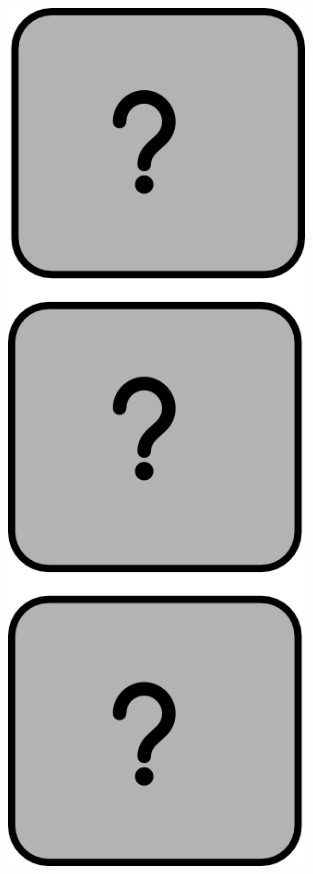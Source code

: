 \documentclass[11pt]{beamer}
\begin{document}
\begin{frame}
\begin{columns}

\begin{column}{0.15\linewidth}
\centering
\begin{figure}
\includegraphics[width=0.7\textwidth]{./topics_inconnus.png}
\end{figure}
\end{column}


\end{columns}
\end{frame}
\end{document}
